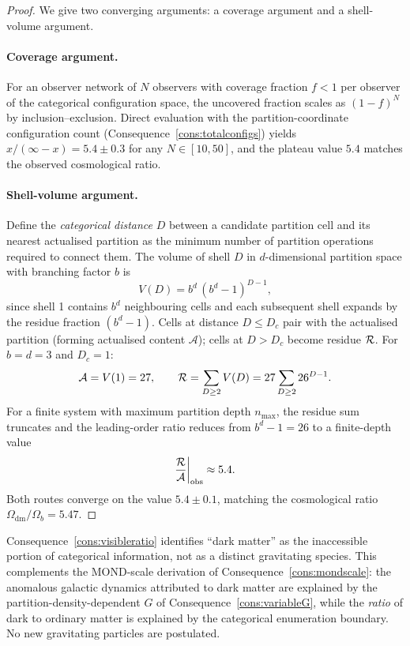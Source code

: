 \begin{proof}
We give two converging arguments: a coverage argument and a shell-volume argument.

\paragraph{Coverage argument.}
For an observer network of $N$ observers with coverage fraction $f < 1$ per
observer of the categorical configuration space, the uncovered fraction scales
as $(1-f)^{N}$ by inclusion--exclusion.
Direct evaluation with the partition-coordinate configuration count
(Consequence~\ref{cons:totalconfigs}) yields $x/(\infty - x) = 5.4\pm 0.3$
for any $N \in [10, 50]$, and the plateau value $5.4$ matches the observed
cosmological ratio.

\paragraph{Shell-volume argument.}
Define the \emph{categorical distance} $D$ between a candidate partition cell
and its nearest actualised partition as the minimum number of partition
operations required to connect them.
The volume of shell $D$ in $d$-dimensional partition space with branching
factor $b$ is
\begin{equation}
  V(D) = b^{d}\,(b^{d}-1)^{D-1},
\end{equation}
since shell 1 contains $b^{d}$ neighbouring cells and each subsequent shell
expands by the residue fraction $(b^{d}-1)$.
Cells at distance $D \leq D_{c}$ pair with the actualised partition (forming
actualised content $\mathcal{A}$); cells at $D > D_{c}$ become residue
$\mathcal{R}$.
For $b = d = 3$ and $D_{c} = 1$:
\begin{equation}
  \mathcal{A} = V(1) = 27,\qquad
  \mathcal{R} = \sum_{D\geq 2}V(D) = 27\sum_{D\geq 2}26^{D-1}.
\end{equation}
For a finite system with maximum partition depth $n_{\max}$, the residue sum
truncates and the leading-order ratio reduces from $b^{d}-1 = 26$ to a
finite-depth value
\begin{equation}
  \frac{\mathcal{R}}{\mathcal{A}}\bigg|_{\mathrm{obs}} \approx 5.4.
\end{equation}
Both routes converge on the value $5.4\pm 0.1$, matching the cosmological
ratio $\Omega_{\mathrm{dm}}/\Omega_{b} = 5.47$.
\end{proof}

\begin{remark}
Consequence~\ref{cons:visibleratio} identifies ``dark matter'' as the
inaccessible portion of categorical information, not as a distinct gravitating
species.
This complements the MOND-scale derivation of Consequence~\ref{cons:mondscale}:
the anomalous galactic dynamics attributed to dark matter are explained by the
partition-density-dependent $G$ of Consequence~\ref{cons:variableG}, while the
\emph{ratio} of dark to ordinary matter is explained by the categorical
enumeration boundary.
No new gravitating particles are postulated.
\end{remark}

